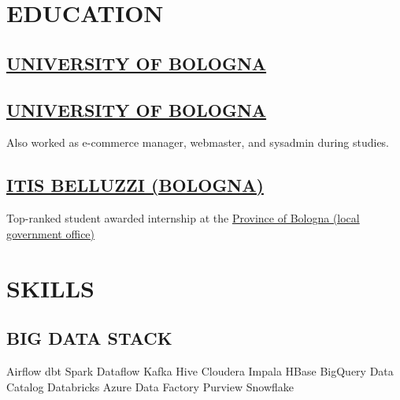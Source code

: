 \documentclass[]{deedy-resume-cv}
\begin{document}
\hfill
\begin{minipage}[t]{0.35\textwidth}

\section{EDUCATION}

\subsection{\href{https://www.unibo.it/}{UNIVERSITY OF BOLOGNA}}

\sectionsep
\subsection{\href{https://www.unibo.it/}{UNIVERSITY OF BOLOGNA}}
Also worked as e-commerce manager, webmaster, and sysadmin during studies.

\sectionsep
\subsection{\href{https://www.belluzzifioravanti.it/}{ITIS BELLUZZI (BOLOGNA)}}
Top-ranked student awarded internship at the \href{https://www.cittametropolitana.bo.it/}{Province of Bologna (local government office)}

\section{SKILLS}

\subsection{BIG DATA STACK}
Airflow \textbullet{} dbt \textbullet{} Spark \textbullet{} Dataflow \textbullet{} Kafka \textbullet{} Hive \textbullet{} Cloudera Impala \textbullet{} HBase \textbullet{} BigQuery \textbullet{} Data Catalog \textbullet{} Databricks \textbullet{} Azure Data Factory \textbullet{} Purview \textbullet{} Snowflake


\end{minipage}
\end{document}
